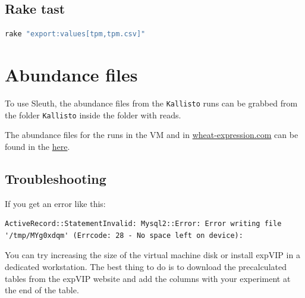 \subsection{Rake tast}\label{rake-tast}

\begin{lstlisting}[language=sh]
rake "export:values[tpm,tpm.csv]"
\end{lstlisting}

\section{Abundance files}\label{abundance-files}

To use Sleuth, the abundance files from the \lstinline!Kallisto! runs
can be grabbed from the folder \lstinline!Kallisto! inside the folder
with reads.

The abundance files for the runs in the VM and in
\href{http://www.wheat-expression.com}{wheat-expression.com} can be
found in the
\href{https://www.dropbox.com/sh/dap4eer67qfe9om/AADEyXZ393jY9czjAlArsemma?dl=0}{here}.

\subsection{Troubleshooting}\label{troublshooting}

If you get an error like this:

\begin{lstlisting}
ActiveRecord::StatementInvalid: Mysql2::Error: Error writing file '/tmp/MYg0xdqm' (Errcode: 28 - No space left on device):
\end{lstlisting}

You can try increasing the size of the virtual machine disk or install
expVIP in a dedicated workstation. The best thing to do is to download
the precalculated tables from the expVIP website and add the columns
with your experiment at the end of the table.
